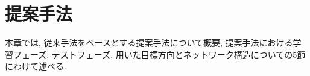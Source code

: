 \chapter{提案手法}
\label{chap:suggest}
%
本章では, 従来手法をベースとする提案手法について概要, 提案手法における学習フェーズ, テストフェーズ, 用いた目標方向とネットワーク構造についての5節にわけて述べる.
%
%





%

